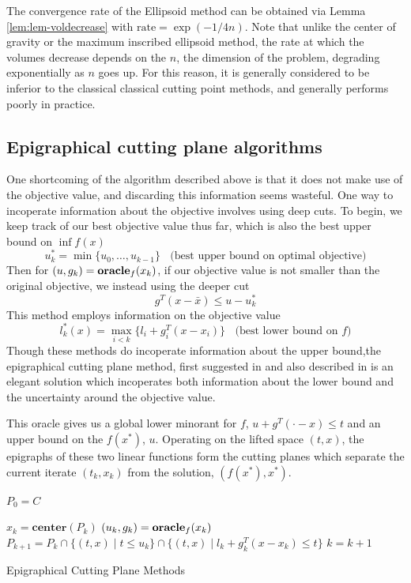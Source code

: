 The convergence rate of the Ellipsoid method can be obtained via Lemma
\ref{lem:lem-voldecrease} with $\mbox{rate} = \exp(-1/4n)$. Note that unlike
the center of gravity or the maximum inscribed ellipsoid method, the rate at
which the volumes decrease depends on the $n$, the dimension of the problem,
degrading exponentially as $n$ goes up. For this reason, it is generally
considered to be inferior to the classical classical cutting point methods,
and generally performs poorly in practice.

\subsection{Epigraphical cutting plane algorithms}

One shortcoming of the algorithm described above is that it does not make
use of the objective value, and discarding this information seems
wasteful. One way to incoperate information about the objective
 involves using deep cuts. To begin, we keep track of our best objective value thus far,
which is also the best upper bound on $\inf f(x)$
$$
u^*_k = \min{ \{ u_0, \dots, u_{k-1}\} } \;\; \mbox{ (best upper bound on optimal objective)} 
$$
Then for $(u, g_k) = \mbox{\bf oracle}_f(x_k)$, if our objective value is not smaller
than the original objective, we instead using the deeper cut
$$
g^T(x - \bar{x}) \leq u - u^*_k
$$
This method employs information on the objective value 
$$
l^*_k(x) = \max_{i < k}\{l_i + g_i^T(x-x_i)\} \;\; \mbox{ (best lower bound on $f$)}
$$
Though these methods do incoperate information about the upper bound,the epigraphical cutting plane method, first suggested in
\cite{bahn1994experimental} and also described in
\cite{boyd2007localization,goffin1999two,mehrotra2000volumetric} is an elegant
solution which incoperates both information about the lower bound and the 
uncertainty around the objective value.

This oracle gives us a global lower minorant for $f$, $u + g^T(\cdot - x) \leq t$ and an upper bound on the $f(x^*)$, $u$. Operating on the lifted space $(t,x)$, the epigraphs of these two linear functions form the cutting planes which separate the current iterate $(t_k, x_k)$ from the solution, $(f(x^*), x^*)$. 
\begin{algorithm} 
  \SetAlgoNoLine
  \DontPrintSemicolon
  $P_0 = C$\;
  
   {
  \nl $x_{k}  = \mathbf{center}(P_k)$\;
  \nl $(u_{k},g_{k})  = \mbox{\bf oracle}_f(x_{k})$\;
  \nl $P_{k+1}  =P_{k}\cap\{(t,x)\mid t\leq u_{k}\}\cap\{(t,x)\mid l_{k}+g_{k}^{T}(x-x_{k})\leq t\}$\;
  \nl $k = k + 1$
  }
  \caption{Epigraphical Cutting Plane Methods \label{alg:cutting_plane_epi}}
\end{algorithm}

